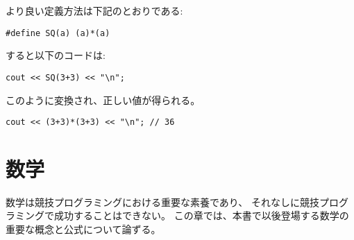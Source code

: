 \begin{comment}
A better version of the macro is as follows:
\begin{lstlisting}
#define SQ(a) (a)*(a)
\end{lstlisting}
Now the code
\begin{lstlisting}
cout << SQ(3+3) << "\n";
\end{lstlisting}
corresponds to the code
\begin{lstlisting}
cout << (3+3)*(3+3) << "\n"; // 36
\end{lstlisting}
\end{comment}

より良い定義方法は下記のとおりである:
\begin{lstlisting}
#define SQ(a) (a)*(a)
\end{lstlisting}
すると以下のコードは:
\begin{lstlisting}
cout << SQ(3+3) << "\n";
\end{lstlisting}
このように変換され、正しい値が得られる。
\begin{lstlisting}
cout << (3+3)*(3+3) << "\n"; // 36
\end{lstlisting}

\begin{comment}
\section{Mathematics}

Mathematics plays an important role in competitive
programming, and it is not possible to become
a successful competitive programmer without
having good mathematical skills.
This section discusses some important
mathematical concepts and formulas that
are needed later in the book.
\end{comment}

\section{数学}

数学は競技プログラミングにおける重要な素養であり、
それなしに競技プログラミングで成功することはできない。
この章では、本書で以後登場する数学の重要な概念と公式について論ずる。

\begin{comment}
\subsubsection{Sum formulas}

Each sum of the form
\[\sum_{x=1}^n x^k = 1^k+2^k+3^k+\ldots+n^k,\]
where $k$ is a positive integer,
has a closed-form formula that is a
polynomial of degree $k+1$.
For example\footnote{\index{Faulhaber's formula}
There is even a general formula for such sums, called \key{Faulhaber's formula},
but it is too complex to be presented here.},
\[\sum_{x=1}^n x = 1+2+3+\ldots+n = \frac{n(n+1)}{2}\]
and
\[\sum_{x=1}^n x^2 = 1^2+2^2+3^2+\ldots+n^2 = \frac{n(n+1)(2n+1)}{6}.\]
\end{comment}

